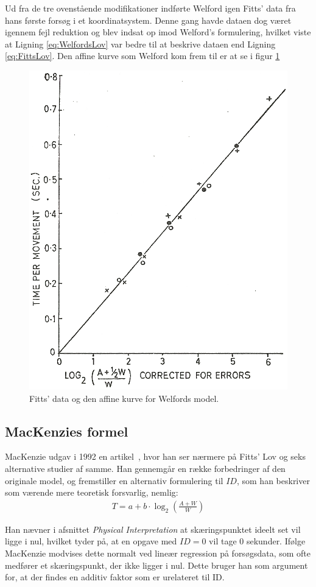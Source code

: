 Ud fra de tre ovenstående modifikationer indførte Welford igen Fitts' data fra hans første forsøg i et koordinatsystem. Denne gang havde dataen dog været igennem fejl reduktion og blev indsat op imod Welford's formulering, hvilket viste at Ligning \ref{eq:WelfordsLov} var bedre til at beskrive dataen end Ligning \ref{eq:FittsLov}. Den affine kurve som Welford kom frem til er at se i figur \ref{fig:WelfordGraf2}
\begin{figure}[h]
\centering
\includegraphics[width=.5\textwidth]{images/illustrations/welford_plot_2}
\caption{Fitts' data og den affine kurve for Welfords model.}
\label{fig:WelfordGraf2}
\end{figure}

\subsection*{MacKenzies formel}
MacKenzie udgav i 1992 en artikel~\cite{mackenzie1992}, hvor han ser nærmere på Fitts' Lov og seks alternative studier af samme. Han gennemgår en række forbedringer af den originale model, og fremstiller en alternativ formulering til $ID$, som han beskriver som værende mere teoretisk forsvarlig, nemlig:
\begin{align}
T=a+b\cdot\log_2\left({\frac{A+W}{W}}\right)
\end{align}

Han nævner i afsnittet \emph{Physical Interpretation} at skæringspunktet ideelt set vil ligge i nul, hvilket tyder på, at en opgave med $ID=0$ vil tage 0 sekunder. Ifølge MacKenzie modvises dette normalt ved lineær regression på forsøgsdata, som ofte medfører et skæringspunkt, der ikke ligger i nul. Dette bruger han som argument for, at der findes en additiv faktor som er urelateret til ID.\\


